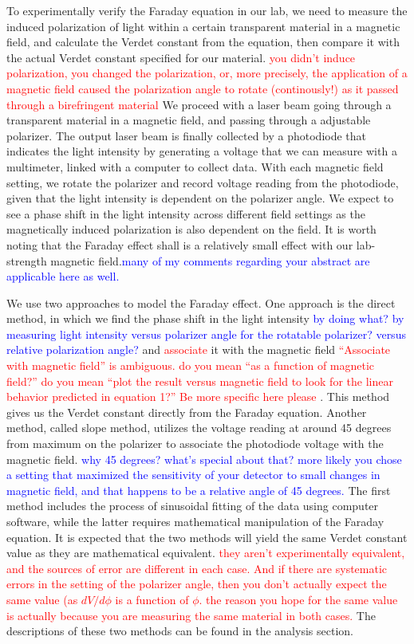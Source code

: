 \documentclass[prb,preprint]{revtex4-1}
\begin{document}
To experimentally verify the Faraday equation in our lab, we need to measure the induced polarization of light within a certain transparent material in a magnetic field, and calculate the Verdet constant from the equation, then compare it with the actual Verdet constant specified for our material. \textcolor{red}{you didn't induce polarization, you changed the polarization, or, more precisely, the application of a magnetic field caused the polarization angle to rotate (continously!) as it passed through a birefringent material} We proceed with a laser beam going through a transparent material in a magnetic field, and passing through a adjustable polarizer. The output laser beam is finally collected by a photodiode that indicates the light intensity by generating a voltage that we can measure with a multimeter, linked with a computer to collect data. With each magnetic field setting, we rotate the polarizer and record voltage reading from the photodiode, given that the light intensity is dependent on the polarizer angle. We expect to see a phase shift in the light intensity across different field settings as the magnetically induced polarization is also dependent on the field. It is worth noting that the Faraday effect shall is a relatively small effect with our lab-strength magnetic field.\textcolor{blue}{many of my comments regarding your abstract are applicable here as well.} 

We use two approaches to model the Faraday effect. One approach is the direct method, in which we find the phase shift in the light intensity \textcolor{blue}{by doing what? by measuring light intensity versus polarizer angle for the rotatable polarizer? versus relative polarization angle? } and \textcolor{red}{associate} it with the magnetic field \textcolor{red}{``Associate with magnetic field'' is ambiguous. do you mean ``as a function of magnetic field?'' do you mean ``plot the result versus magnetic field to look for the linear behavior predicted in equation 1?'' Be more specific here please} . This method gives us the Verdet constant directly from the Faraday equation. Another method, called slope method, utilizes the voltage reading at around 45 degrees from maximum on the polarizer to associate the photodiode voltage with the magnetic field. \textcolor{blue}{why 45 degrees? what's special about that? more likely you chose a setting that maximized the sensitivity of your detector to small changes in magnetic field, and that happens to be a relative angle of 45 degrees.} The first method includes the process of sinusoidal fitting of the data using computer software, while the latter requires mathematical manipulation of the Faraday equation. It is expected that the two methods will yield the same Verdet constant value as they are mathematical equivalent. \textcolor{red}{they aren't experimentally equivalent, and the sources of error are different in each case. And if there are systematic errors in the setting of the polarizer angle, then you don't actually expect the same value (as $dV/d\phi$ is a function of $\phi$. the reason you hope for the same value is actually because you are measuring the same material in both cases.} The descriptions of these two methods can be found in the analysis section.
\end{document}
